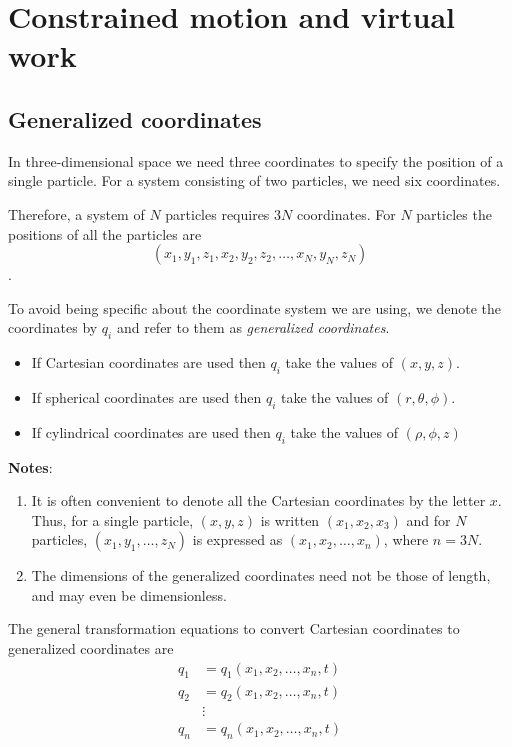 \section{Constrained motion and virtual work}

\subsection{Generalized coordinates}
In three-dimensional space we need three coordinates to specify the position of a single particle. For a system consisting of two particles, we need six coordinates. 

Therefore, a system of $N$ particles requires $3N$ coordinates. For $N$ particles the positions of all the particles are
$$(x_1,y_1,z_1,x_2,y_2,z_2,\dots,x_N,y_N,z_N)$$.

To avoid being specific about the coordinate system we are using, we denote the coordinates by $q_i$ and refer to them as \textit{generalized coordinates}.
\begin{itemize}
	\item If Cartesian coordinates are used then $q_i$ take the values of $(x,y,z)$.
	
	\item If spherical coordinates are used then $q_i$ take the values of $(r,\theta,\phi)$.
	
	\item If cylindrical coordinates are used then $q_i$ take the values of $(\rho,\phi,z)$
\end{itemize}

\textbf{Notes}:
\begin{enumerate}
	\item It is often convenient to denote all the Cartesian coordinates by the letter $x$. Thus, for a single particle, $(x, y, z)$ is written $(x_1, x_2, x_3)$ and for $N$ particles, $(x_1, y_1,\dots,z_N)$ is expressed as $(x_1,x_2,\dots,x_n)$, where $n = 3N$.
	\item The dimensions of the generalized coordinates need not be those of length, and may even be dimensionless.
\end{enumerate}        

The general transformation equations to convert Cartesian coordinates to generalized coordinates are
\begin{equation} \label{eqn:trans_cc-gen}
	\begin{aligned}
		q_1&=q_1(x_1,x_2,\dots,x_n,t) \\
		q_2&=q_2(x_1,x_2,\dots,x_n,t) \\
		&\vdots \\
		q_n&=q_n(x_1,x_2,\dots,x_n,t)
	\end{aligned}
\end{equation}

